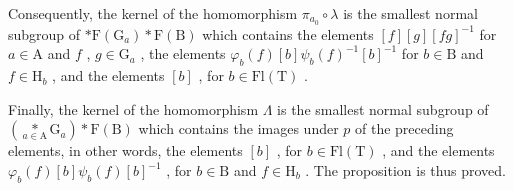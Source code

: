 Consequently, the kernel of the homomorphism \(\pi_{a_0} \circ \lambda\) is the smallest normal subgroup of \(*\mathrm{F}(\mathrm{G}_a) * \mathrm{F}(\mathrm{B})\) which contains the elements \([f][g][fg]^{-1}\) for \(a \in \mathrm{A}\) and \(f\) , \(g \in \mathrm{G}_a\) , the elements \(\varphi_b(f)[b]\psi_b(f)^{-1}[b]^{-1}\) for \(b \in \mathrm{B}\) and \(f \in \mathrm{H}_b\) , and the elements \([b]\) , for \(b \in \mathrm{Fl}(\mathrm{T})\) .

Finally, the kernel of the homomorphism \(\Lambda\) is the smallest normal subgroup of \((\underset{a\in\mathrm{A}}{*}\mathrm{G}_{a})*\mathrm{F}(\mathrm{B})\) which contains the images under \(p\) of the preceding elements, in other words, the elements \([b]\) , for \(b\in\mathrm{Fl}(\mathrm{T})\) , and the elements \(\varphi_{b}(f)[b]\psi_{b}(f)[b]^{-1}\) , for \(b\in\mathrm{B}\) and \(f\in\mathrm{H}_{b}\) . The proposition is thus proved.

